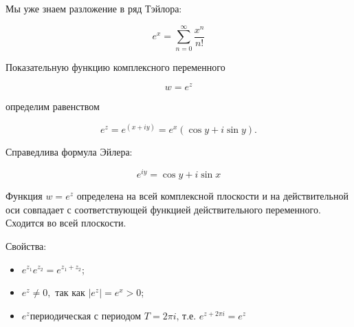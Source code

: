 
\begin{theorem}  \thmslashn
    
    Мы уже знаем разложение в ряд Тэйлора:
    
    \[e^{x}=\sum_{n=0}^{\infty} \frac{x^{n}}{n!}\]
    
	Показательную функцию комплексного переменного 
	
	\[w = e^{z}\]
	
    определим равенством
    
    \[e^{z}=e^{(x+iy)}=e^{x}(\cos{y} + i\sin{y}).\]
    
    Справедлива формула Эйлера:
    
    \[e^{iy}=\cos{y} + i\sin{x}\]
    
    Функция $w = e^{z}$ определена на всей комплексной плоскости и на действительной оси совпадает с соответствующей функцией действительного переменного. Сходится во всей плоскости.
    
    Свойства:
    
    \begin{itemize}
        \item
        
            $e^{z_{1}}e^{z_{2}}=e^{z_{1}+z_{2}}$;
            
        \item
        
            $e^{z}\neq0, \text{ так как } |e^{z}| =  e^{x} > 0$;
            
        \item
            
            $e^{z} \text{периодическая с периодом } T = 2\pi i \text{, т.е. } e^{z+2\pi i} = e^{z}$
            
    \end{itemize}
    
\end{theorem}

